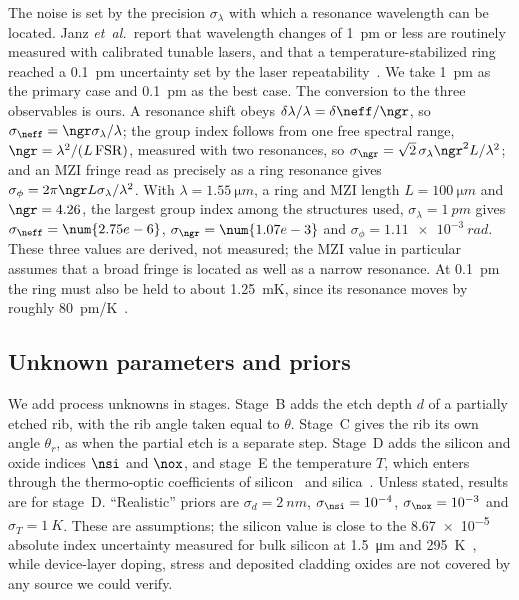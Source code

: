 The noise is set by the precision $\sigma_\lambda$ with which a resonance wavelength can be located. Janz
\textit{et~al.}\ report that wavelength changes of \qty{1}{pm} or less are routinely measured with calibrated tunable
lasers, and that a temperature-stabilized ring reached a \qty{0.1}{pm} uncertainty set by the laser
repeatability~\cite{janz2023}. We take \qty{1}{pm} as the primary case and \qty{0.1}{pm} as the best case. The
conversion to the three observables is ours. A resonance shift obeys
$\delta\lambda/\lambda=\delta\neff/\ngr$, so $\sigma_{\neff}=\ngr\sigma_\lambda/\lambda$; the group index follows from
one free spectral range, $\ngr=\lambda^2/(L\,\mathrm{FSR})$, measured with two resonances, so
$\sigma_{\ngr}=\sqrt2\,\sigma_\lambda\ngr^2L/\lambda^2$; and an MZI fringe read as precisely as a ring resonance gives
$\sigma_\phi=2\pi\ngr L\sigma_\lambda/\lambda^2$. With $\lambda=\qty{1.55}{\micro m}$, a ring and MZI length
$L=\qty{100}{\micro m}$ and $\ngr=4.26$, the largest group index among the structures used, $\sigma_\lambda=\qty{1}{pm}$
gives $\sigma_{\neff}=\num{2.75e-6}$, $\sigma_{\ngr}=\num{1.07e-3}$ and $\sigma_\phi=\qty{1.11e-3}{rad}$. These
three values are derived, not measured; the MZI value in particular assumes that a broad fringe is located as well
as a narrow resonance. At \qty{0.1}{pm} the ring must also be held to about \qty{1.25}{mK}, since its resonance moves
by roughly \qty{80}{pm/K}~\cite{janz2023}.

\subsection{Unknown parameters and priors}

We add process unknowns in stages. Stage~B adds the etch depth $d$ of a partially etched rib, with the rib angle
taken equal to $\theta$. Stage~C gives the rib its own angle $\theta_r$, as when the partial etch is a separate
step. Stage~D adds the silicon and oxide indices $\nsi$ and $\nox$, and stage~E the temperature $T$, which enters
through the thermo-optic coefficients of silicon~\cite{frey2006} and silica~\cite{leviton2008}. Unless stated,
results are for stage~D. ``Realistic'' priors are $\sigma_d=\qty{2}{nm}$, $\sigma_{\nsi}=10^{-4}$,
$\sigma_{\nox}=10^{-3}$ and $\sigma_T=\qty{1}{K}$. These are assumptions; the silicon value is close to the
\num{8.67e-5} absolute index uncertainty measured for bulk silicon at \qty{1.5}{\micro m} and
\qty{295}{K}~\cite{frey2006}, while device-layer doping, stress and deposited cladding oxides are not covered by any
source we could verify.

